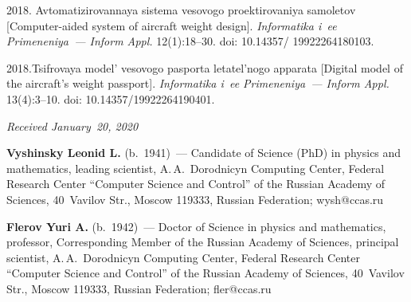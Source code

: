 



\vspace*{12pt}

  \begin{multicols}{2}

\renewcommand{\bibname}{\protect\rmfamily References}

{\small\frenchspacing
 {%
 \begin{thebibliography}{9}
   2018. Avtomatizirovannaya sistema 
vesovogo proektirovaniya samoletov [Computer-aided system of aircraft weight \mbox{design}].
\textit{Informatika i~ee Primeneniya~--- Inform Appl.} 12(1):18--30. doi: 10.14357/ 19922264180103.
{

}

\vspace*{-2pt}

   2018.Tsifrovaya model' 
vesovogo pasporta letatel'nogo apparata [Digital model of the aircraft's weight passport]. 
\textit{Informatika i~ee Primeneniya~--- Inform Appl.} 13(4):3--10. doi: 10.14357/19922264190401.
\end{thebibliography}

 }
 }

\end{multicols}

\vspace*{-3pt}

  \hfill{\small\textit{Received January~20, 2020}}



\vspace*{-12pt}

  \Contr
  
  \noindent
  \textbf{Vyshinsky Leonid L.} (b.\ 1941)~--- Candidate of Science (PhD) in physics and 
mathematics, leading scientist, A.\,A.~Dorodnicyn Computing Center, Federal Research Center 
``Computer Science and Control'' of the Russian Academy of Sciences, 40~Vavilov Str., Moscow 
119333, Russian Federation; \mbox{wysh@ccas.ru} 
  
  \vspace*{3pt}
  
  \noindent
  \textbf{Flerov Yuri A.} (b.\ 1942)~--- 
   Doctor of Science in physics and mathematics, professor, 
   Corresponding Member of the Russian Academy of Sciences,
principal scientist, 
A.\,A.~Dorodnicyn Computing Center, Federal Research Center ``Computer Science and Control'' of 
the Russian Academy of Sciences, 40~Vavilov Str., Moscow 119333, Russian Federation; 
\mbox{fler@ccas.ru}
      
\label{end\stat}

\renewcommand{\bibname}{\protect\rm Литература}